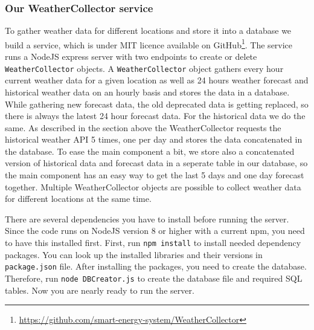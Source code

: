 \subsubsection{Our WeatherCollector service}\label{sec:weathercollector}
To gather weather data for different locations and store it into a database we build a service, which is under MIT licence available on GitHub\footnote{\url{https://github.com/smart-energy-system/WeatherCollector}}.
The service runs a NodeJS express server with two endpoints to create or delete \texttt{WeatherCollector} objects. 
A \texttt{WeatherCollector} object gathers every hour current weather data for a given location as well as 24 hours weather forecast and historical weather data on an hourly basis and stores the data in a database. 
While gathering new forecast data, the old deprecated data is getting replaced, so there is always the latest 24 hour forecast data.
For the historical data we do the same.
As described in the section above the WeatherCollector requests the historical weather API 5 times, one per day and stores the data concatenated in the database.
To ease the main component a bit, we store also a concatenated version of historical data and forecast data in a seperate table in our database, so the main component has an easy way to get the last 5 days and one day forecast together.
Multiple WeatherCollector objects are possible to collect weather data for different locations at the same time.

There are several dependencies you have to install before running the server. 
Since the code runs on NodeJS version 8 or higher with a current npm, you need to have this installed first.
First, run \texttt{npm install} to install needed dependency packages. 
You can look up the installed libraries and their versions in \texttt{package.json} file. 
After installing the packages, you need to create the database. 
Therefore, run \texttt{node DBCreator.js} to create the database file and required SQL tables. 
Now you are nearly ready to run the server.

